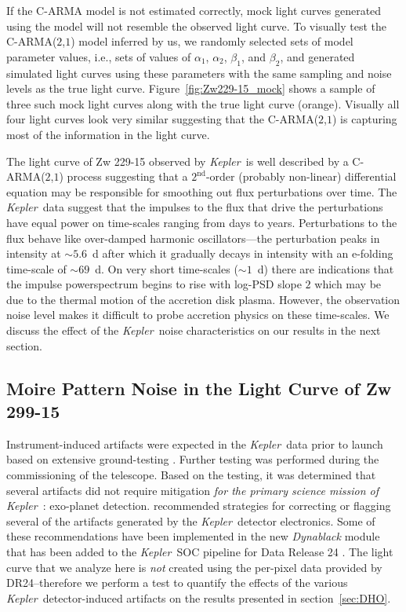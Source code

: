 \documentclass[a4paper,fleqn,usenatbib]{mnras}
\newcommand{\Kepler}{\textit{Kepler~}}
\begin{document}
If the C-ARMA model is not estimated correctly, mock light curves generated using the model will not resemble the observed light curve. To visually test the C-ARMA($2$,$1$) model inferred by us, we randomly selected sets of model parameter values, i.e., sets of values of $\alpha_{1}$, $\alpha_{2}$, $\beta_{1}$, and $\beta_{2}$, and generated simulated light curves using these parameters with the same sampling and noise levels as the true light curve. Figure~\ref{fig:Zw229-15_mock} shows a sample of three such mock light curves along with the true light curve (orange). Visually all four light curves look very similar suggesting that the C-ARMA($2$,$1$) is capturing most of the information in the light curve.

The light curve of Zw 229-15 observed by \Kepler is well described by a C-ARMA($2$,$1$) process suggesting that a $2^{\mathrm{nd}}$-order (probably non-linear) differential equation may be responsible for smoothing out flux perturbations over time. The \Kepler data suggest that the impulses to the flux that drive the perturbations have equal power on time-scales ranging from days to years. Perturbations to the flux behave like over-damped harmonic oscillators---the perturbation peaks in intensity at $\sim 5.6$~d after which it gradually decays in intensity with an $\mathrm{e}$-folding time-scale of $\sim 69$~d. On very short time-scales ($\sim 1$~d) there are indications that the impulse powerspectrum begins to rise with log-PSD slope $2$ which may be due to the thermal motion of the accretion disk plasma. However, the observation noise level makes it difficult to probe accretion physics on these time-scales. We discuss the effect of the \Kepler noise characteristics on our results in the next section.

\subsection[Moire Pattern Noise]{Moire Pattern Noise in the Light Curve of Zw 299-15}\label{sec:MPD}

Instrument-induced artifacts were expected in the \Kepler data prior to launch based on extensive ground-testing \citep{Kol10}. Further testing was performed during the commissioning of the telescope. Based on the testing, it was determined that several artifacts did not require mitigation \textit{for the primary science mission of} \Kepler: exo-planet detection. \citet{Kol10} recommended strategies for correcting or flagging several of the artifacts generated by the \Kepler detector electronics. Some of these recommendations have been implemented in the new \textit{Dynablack} module \citep{Clarke14} that has been added to the \Kepler SOC pipeline for Data Release 24 \citep{DR24}. The light curve that we analyze here is \textit{not} created using the per-pixel data provided by DR24--therefore we perform a test to quantify the effects of the various \Kepler detector-induced artifacts on the results presented in section~\ref{sec:DHO}.
\end{document}
